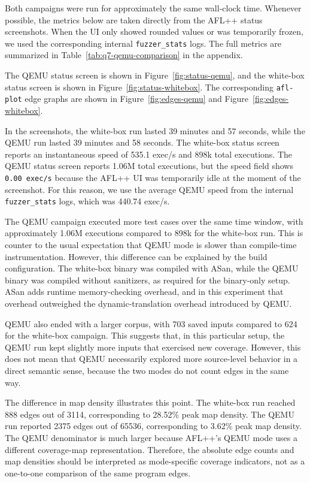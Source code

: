 \documentclass[letterpaper,twocolumn,10pt]{article}
\begin{document}
Both campaigns were run for approximately the same wall-clock time. Whenever
possible, the metrics below are taken directly from the AFL++ status screenshots.
When the UI only showed rounded values or was temporarily frozen, we used the
corresponding internal \texttt{fuzzer\_stats} logs.
The full metrics are summarized in Table~\ref{tab:q7-qemu-comparison} in the appendix.


The QEMU status screen is shown in
Figure~\ref{fig:status-qemu}, and the white-box status screen is shown in
Figure~\ref{fig:status-whitebox}. The corresponding \texttt{afl-plot} edge
graphs are shown in Figure~\ref{fig:edges-qemu} and
Figure~\ref{fig:edges-whitebox}.

In the screenshots, the white-box run lasted 39 minutes and 57 seconds, while
the QEMU run lasted 39 minutes and 58 seconds. The white-box status screen
reports an instantaneous speed of 535.1 exec/s and 898k total executions. The
QEMU status screen reports 1.06M total executions, but the speed field shows
\texttt{0.00 exec/s} because the AFL++ UI was temporarily idle at the moment of
the screenshot. For this reason, we use the average QEMU speed from the internal
\texttt{fuzzer\_stats} logs, which was 440.74 exec/s.

The QEMU campaign executed more test cases over the same time window, with
approximately 1.06M executions compared to 898k for the white-box run. This is
counter to the usual expectation that QEMU mode is slower than compile-time
instrumentation. However, this difference can be explained by the build
configuration. The white-box binary was compiled with ASan, while the QEMU binary
was compiled without sanitizers, as required for the binary-only setup. ASan adds
runtime memory-checking overhead, and in this experiment that overhead outweighed
the dynamic-translation overhead introduced by QEMU.

QEMU also ended with a larger corpus, with 703 saved inputs compared to 624 for
the white-box campaign. This suggests that, in this particular setup, the QEMU
run kept slightly more inputs that exercised new coverage. However, this does
not mean that QEMU necessarily explored more source-level behavior in a direct
semantic sense, because the two modes do not count edges in the same way.

The difference in map density illustrates this point. The white-box run reached
888 edges out of 3114, corresponding to 28.52\% peak map density. The QEMU run
reported 2375 edges out of 65536, corresponding to 3.62\% peak map density. The
QEMU denominator is much larger because AFL++'s QEMU mode uses a different
coverage-map representation. Therefore, the absolute edge counts and map
densities should be interpreted as mode-specific coverage indicators, not as a
one-to-one comparison of the same program edges.
\end{document}
